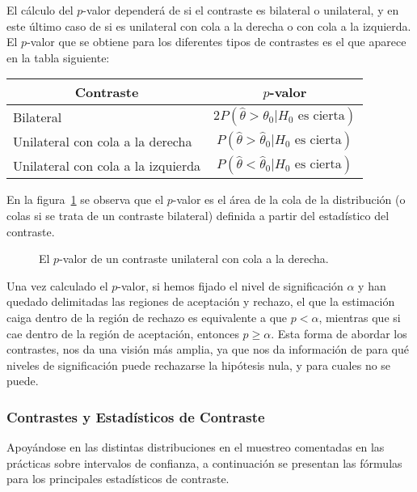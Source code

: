 El cálculo del $p$-valor dependerá de si el contraste es bilateral o unilateral, y en este último caso de si es
unilateral con cola a la derecha o con cola a la izquierda.
El $p$-valor que se obtiene para los diferentes tipos de contrastes es el que aparece en la tabla siguiente:

\begin{center}
\begin{tabular}{|l|l|}
\hline
\multicolumn{1}{|c|}{Contraste} & \multicolumn{1}{c|}{$p$-valor} \\
\hline
\multicolumn{1}{|l|}{Bilateral } & \multicolumn{1}{c|}{$2P( \hat{\theta}  > \hat{\theta} _0 |H_0\textrm{ es cierta})$} \\
\hline
\multicolumn{1}{|l|}{Unilateral con cola a la derecha} & \multicolumn{1}{c|}{$P( \hat\theta  > \hat\theta _0|H_0\textrm{ es cierta})$} \\
\hline
\multicolumn{1}{|l|}{Unilateral con cola a la izquierda} & \multicolumn{1}{c|}{$P( \hat\theta  < \hat\theta _0|H_0\textrm{ es cierta})$} \\
\hline
\end{tabular}
\end{center}

En la figura~\ref{g:pvalor} se observa que el $p$-valor es el área de la cola de la distribución (o colas si se trata de
un contraste bilateral) definida a partir del estadístico del contraste.

\begin{figure}[h!]
\begin{center}
\scalebox{0.8}{}
\caption{El $p$-valor de un contraste unilateral con cola a la derecha.}
\label{g:pvalor}
\end{center}
\end{figure}

Una vez calculado el $p$-valor, si hemos fijado el nivel de significación $\alpha$ y han quedado delimitadas las
regiones de aceptación y rechazo, el que la estimación caiga dentro de la región de rechazo es equivalente a que
$p<\alpha$, mientras que si cae dentro de la región de aceptación, entonces $p\geq \alpha$.
Esta forma de abordar los contrastes, nos da una visión más amplia, ya que nos da información de para qué niveles de
significación puede rechazarse la hipótesis nula, y para cuales no se puede.


\subsubsection{Contrastes y Estadísticos de Contraste}
Apoyándose en las distintas distribuciones en el muestreo comentadas en las prácticas sobre intervalos de confianza, a
continuación se presentan las fórmulas para los principales estadísticos de contraste.

